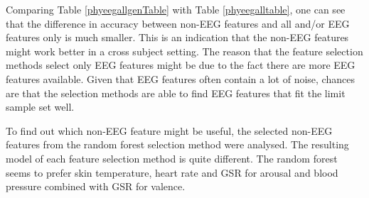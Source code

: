 Comparing Table \ref{phyeegallgenTable} with Table \ref{phyeegalltable}, one can see that the difference in accuracy between non-EEG features and all and/or EEG features only is much smaller. This is an indication that the non-EEG features might work better in a cross subject setting. The reason that the feature selection methods select only EEG features might be due to the fact there are more EEG features available. Given that EEG features often contain a lot of noise, chances are that the selection methods are able to find EEG features that fit the limit sample set well. 

\npar

To find out which non-EEG feature might be useful, the selected non-EEG features from the random forest selection method were analysed. The resulting model of each feature selection method is quite different. The random forest seems to prefer skin temperature, heart rate and GSR for arousal and blood pressure combined with GSR for valence.

\clearpage

